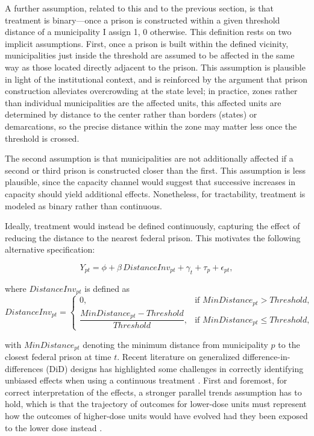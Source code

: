 A further assumption, related to this and to the previous section, is that treatment is binary—once a prison is constructed within a given threshold distance of a municipality I assign 1, 0 otherwise. This definition rests on two implicit assumptions. First, once a prison is built within the defined vicinity, municipalities just inside the threshold are assumed to be affected in the same way as those located directly adjacent to the prison. This assumption is plausible in light of the institutional context, and is reinforced by the argument that prison construction alleviates overcrowding at the state level; in practice, zones rather than individual municipalities are the affected units, this affected units are determined by distance to the center rather than borders (states) or demarcations, so the precise distance within the zone may matter less once the threshold is crossed.

The second assumption is that municipalities are not additionally affected if a second or third prison is constructed closer than the first. This assumption is less plausible, since the capacity channel would suggest that successive increases in capacity should yield additional effects. Nonetheless, for tractability, treatment is modeled as binary rather than continuous.

Ideally, treatment would instead be defined continuously, capturing the effect of reducing the distance to the nearest federal prison. This motivates the following alternative specification:

\begin{equation}
\label{eq:eq4}
    Y_{pt} = \phi + \beta \, DistanceInv_{pt} + \gamma_t + \tau_p + \epsilon_{pt},
\end{equation}

where $DistanceInv_{pt}$ is defined as
\begin{equation}
\label{eq:eq5}
DistanceInv_{pt} =
\begin{cases}
0, & \text{if } MinDistance_{pt} > Threshold, \\
\dfrac{MinDistance_{pt} - Threshold}{Threshold}, & \text{if } MinDistance_{pt} \leq Threshold,
\end{cases}
\end{equation}

with $MinDistance_{pt}$ denoting the minimum distance from municipality $p$ to the closest federal prison at time $t$. Recent literature on generalized difference-in-differences (DiD) designs has highlighted some challenges in correctly identifying unbiased effects when using a continuous treatment \citep{Cont-Chaise-AEA, CallawayGoodmanBaconSantAnna2024}. First and foremost, for correct interpretation of the effects, a stronger parallel trends assumption has to hold, which is that the trajectory of outcomes for lower-dose units must represent how the outcomes of higher-dose units would have evolved had they been exposed to the lower dose instead \citep{CallawayGoodmanBaconSantAnna2024}.

